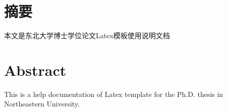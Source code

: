 \chapter{摘\quad 要}%
\linespread{1.5}

本文是东北大学博士学位论文Latex模板使用说明文档

\chapter{Abstract}%

This is a help documentation of Latex template for the Ph.D. thesis in Northeastern University.

